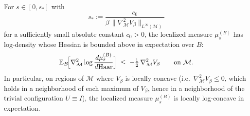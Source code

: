 \begin{lemma}
\label{lem:log_concave_localized}
For $s\in[0,s_{*}]$ with
\[
  s_{*}:=\frac{c_{0}}{\beta\,\|\nabla_{\mathcal{M}}^{2}V_{\beta}\|_{L^{\infty}(\mathcal{M})}}
\]
for a sufficiently small absolute constant $c_{0}>0$, the localized
measure $\mu_{s}^{(B)}$ has log-density whose Hessian is bounded
above in expectation over $B$:
\[
  \mathbb{E}_{B}\!\Bigl[\nabla_{\mathcal{M}}^{2}\log\frac{d\mu_{s}^{(B)}}{d\mathrm{Haar}}\Bigr]
  \;\le\; -\tfrac{1}{2}\,\nabla_{\mathcal{M}}^{2}V_{\beta}
  \qquad\text{on } \mathcal{M}.
\]
In particular, on regions of $\mathcal{M}$ where $V_{\beta}$ is
locally concave (i.e.\ $\nabla_{\mathcal{M}}^{2}V_{\beta}\le 0$,
which holds in a neighborhood of each maximum of $V_{\beta}$, hence
in a neighborhood of the trivial configuration $U\equiv I$), the
localized measure $\mu_{s}^{(B)}$ is locally log-concave in
expectation.
\end{lemma}

